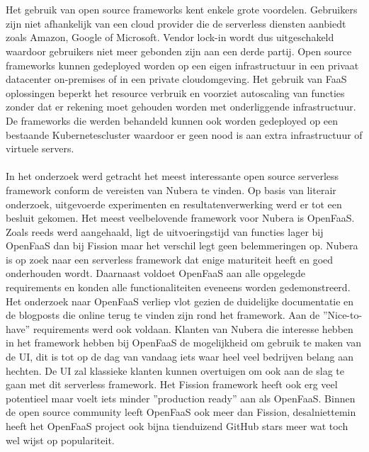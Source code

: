 \\\\
Het gebruik van open source frameworks kent enkele grote voordelen. Gebruikers zijn niet afhankelijk van een cloud provider die de serverless diensten aanbiedt zoals Amazon, Google of Microsoft. Vendor lock-in wordt dus uitgeschakeld waardoor gebruikers niet meer gebonden zijn aan een derde partij. Open source frameworks kunnen gedeployed worden op een eigen infrastructuur in een privaat datacenter on-premises of in een private cloudomgeving. Het gebruik van FaaS oplossingen beperkt het resource verbruik en voorziet autoscaling van functies zonder dat er rekening moet gehouden worden met onderliggende infrastructuur. De frameworks die werden behandeld kunnen ook worden gedeployed op een bestaande Kubernetescluster waardoor er geen nood is aan extra infrastructuur of virtuele servers.
\\\\
In het onderzoek werd getracht het meest interessante open source serverless framework conform de vereisten van Nubera te vinden. Op basis van literair onderzoek, uitgevoerde experimenten en resultatenverwerking werd er tot een besluit gekomen. Het meest veelbelovende framework voor Nubera is OpenFaaS. Zoals reeds werd aangehaald, ligt de uitvoeringstijd van functies lager bij OpenFaaS dan bij Fission maar het verschil legt geen belemmeringen op. Nubera is op zoek naar een serverless framework dat enige maturiteit heeft en goed onderhouden wordt. Daarnaast voldoet OpenFaaS aan alle opgelegde requirements en konden alle functionaliteiten eveneens worden gedemonstreerd. Het onderzoek naar OpenFaaS verliep vlot gezien de duidelijke documentatie en de blogposts die online terug te vinden zijn rond het framework. Aan de ''Nice-to-have'' requirements werd ook voldaan. Klanten van Nubera die interesse hebben in het framework hebben bij OpenFaaS de mogelijkheid om gebruik te maken van de UI, dit is tot op de dag van vandaag iets waar heel veel bedrijven belang aan hechten. De UI zal klassieke klanten kunnen overtuigen om ook aan de slag te gaan met dit serverless framework. Het Fission framework heeft ook erg veel potentieel maar voelt iets minder ''production ready'' aan als OpenFaaS. Binnen de open source community leeft OpenFaaS ook meer dan Fission, desalniettemin heeft het OpenFaaS project ook bijna tienduizend GitHub stars meer wat toch wel wijst op populariteit.
\\\\
